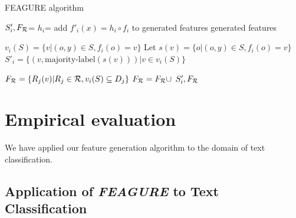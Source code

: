 \documentclass[letterpaper]{article} %
\theoremstyle{definition}
\begin{document}
\begin{algorithm}[H]
	\caption{FEAGURE algorithm}
	\label{code-creating-prob}
	\small
	\begin{algorithmic}
		\State $S'_i,F_{\cal R}$=  %
		\State $h_i$=  
		\State add $f'_i(x)=h_i\circ f_i$ to generated features
		\EndFor
		\State \Return generated features
		\EndFunction

		\State $v_i(S) = \{v | (o,y) \in S, f_{i}(o)=v\}$
		\State Let $s(v)=\{o | (o,y)\in S, f_{i}(o)=v\}$
		\State 	$S'_i = \{ (v, \mbox{majority-label}(s(v))) | v \in v_i(S)\}$
		
		
		\State $F_{\cal R}=\{R_j(v)| R_j\in{\cal R}, v_i(S)\subseteq D_j\}$
		 \State $F_{\cal R}=F_{\cal R}\cup$
		\EndIf
		\State \Return $S'_i, F_{\cal R}$ 
		\EndFunction
		
	\end{algorithmic}
\end{algorithm}

\section{Empirical evaluation}
We have applied our feature generation algorithm to the domain of text classification.

\subsection{Application of \emph{FEAGURE} to Text Classification} \label{text-feagure}

\end{document}
